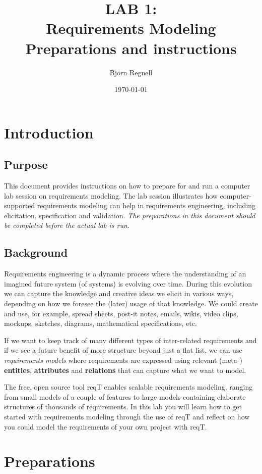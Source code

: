 \documentclass[11pt]{article}
\title{{\bf LAB 1:\\Requirements Modeling}\\ Preparations and instructions}
\author{Björn Regnell}
\date{\today}
\begin{document}
\maketitle

\section{Introduction}

\subsection{Purpose} This document provides instructions on how to prepare for and run a computer lab session on requirements modeling. The lab session illustrates how computer-supported requirements modeling can help in requirements engineering, including elicitation, specification and validation. {\it The preparations in this document should be completed before the actual lab is run.}

\subsection{Background} Requirements engineering is a dynamic process where the understanding of an imagined future system (of systems) is evolving over time. During this evolution we can capture the knowledge and creative ideas we elicit in various ways, depending on how we foresee the (later) usage of that knowledge. We could create and use, for example, spread sheets, post-it notes, emails, wikis, video clips, mockups, sketches, diagrams, mathematical specifications, etc. 

If we want to keep track of many different types of inter-related requirements and if we see a future benefit of more structure beyond just a flat list, we can use {\it requirements models} where requirements are expressed using relevant (meta-) {\bf entities}, {\bf attributes} and {\bf relations} that can capture what we want to model.   

The free, open source tool reqT enables scalable requirements modeling, ranging from small models of a couple of features to large models containing elaborate structures of thousands of requirements. In this lab you will learn how to get started with requirements modeling through the use of reqT and reflect on how you could model the requirements of your own project with reqT.

\clearpage\newpage
\section{Preparations}
\end{document}
